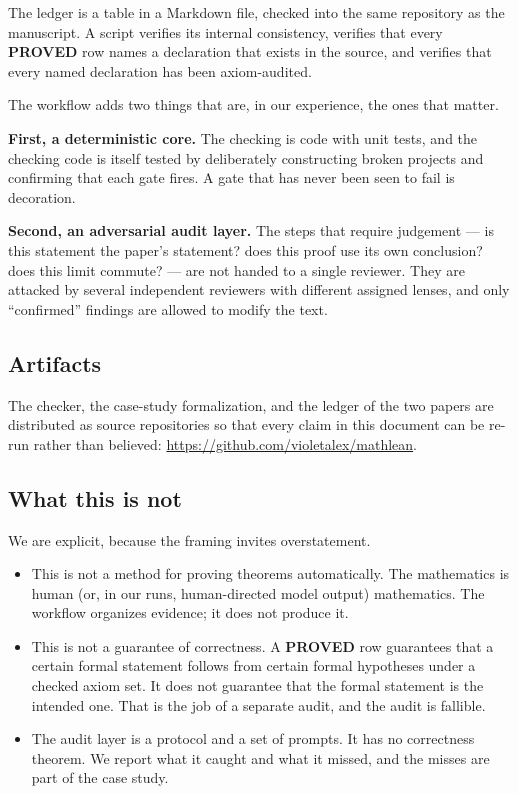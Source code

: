 \documentclass[11pt]{article}
\newcommand{\claim}[1]{\textbf{#1}}
\begin{document}
The ledger is a table in a Markdown file, checked into the same repository as
the manuscript. A script verifies its internal consistency, verifies that every
\claim{PROVED} row names a declaration that exists in the source, and verifies
that every named declaration has been axiom-audited.

The workflow adds two things that are, in our experience, the ones that
matter.

\textbf{First, a deterministic core.} The checking is code with unit tests, and
the checking code is itself tested by deliberately constructing broken projects
and confirming that each gate fires. A gate that has never been seen to fail is
decoration.

\textbf{Second, an adversarial audit layer.} The steps that require judgement
--- is this statement the paper's statement? does this proof use its own
conclusion? does this limit commute? --- are not handed to a single reviewer.
They are attacked by several independent reviewers with different assigned
lenses, and only ``confirmed'' findings are allowed to modify the text.

\subsection{Artifacts}

The checker, the case-study formalization, and the ledger of the two papers are
distributed as source repositories so that every claim in this document can be
re-run rather than believed:
\url{https://github.com/violetalex/mathlean}.

\subsection{What this is not}

We are explicit, because the framing invites overstatement.

\begin{itemize}
\item This is not a method for proving theorems automatically. The mathematics
  is human (or, in our runs, human-directed model output) mathematics. The
  workflow organizes evidence; it does not produce it.
\item This is not a guarantee of correctness. A \claim{PROVED} row guarantees
  that a certain formal statement follows from certain formal hypotheses under
  a checked axiom set. It does not guarantee that the formal statement is the
  intended one. That is the job of a separate audit, and the audit is
  fallible.
\item The audit layer is a protocol and a set of prompts. It has no correctness
  theorem. We report what it caught and what it missed, and the misses are part
  of the case study.
\end{itemize}
\end{document}
